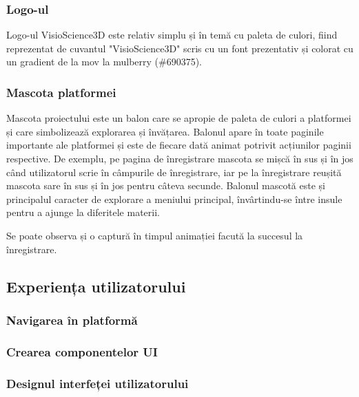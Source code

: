 
\subsubsection{Logo-ul}
Logo-ul VisioScience3D este relativ simplu și în temă cu paleta de culori, fiind reprezentat
de cuvantul "VisioScience3D" scris cu un font prezentativ și colorat cu un gradient de la
mov la mulberry (\#690375).



\subsubsection{Mascota platformei}
Mascota proiectului este un balon care se apropie de paleta de culori a platformei
și care simbolizează explorarea și învățarea. Balonul apare în toate paginile importante ale platformei
și este de fiecare dată animat potrivit acțiunilor paginii respective. De exemplu, pe pagina de 
înregistrare mascota se mișcă în sus și în jos când utilizatorul scrie în câmpurile de
înregistrare, iar pe la înregistrare reușită mascota sare în sus și în jos pentru câteva secunde.
Balonul mascotă este și principalul caracter de explorare a meniului principal, învârtindu-se între
insule pentru a ajunge la diferitele materii.


Se poate observa și o captură în timpul animației facută la succesul la înregistrare.


\subsection{Experiența utilizatorului}
\subsubsection{Navigarea în platformă}
\subsubsection{Crearea componentelor UI}
\subsubsection{Designul interfeței utilizatorului}

